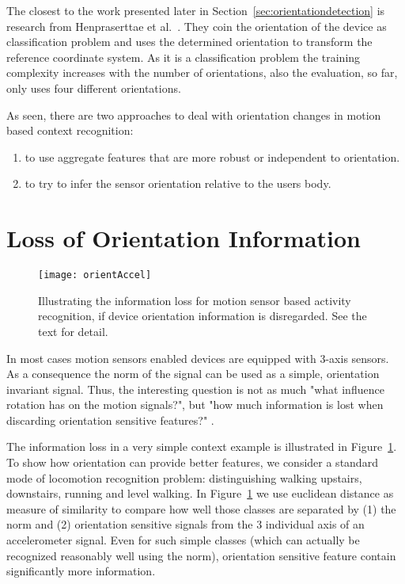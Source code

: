 The closest to the work presented later in Section~\ref{sec:orientationdetection} is research from Henpraserttae et al.~\cite{Henpraserttae:2011fa}. They coin the orientation of the device as classification problem and uses the determined orientation to transform the reference coordinate system. As it is a classification problem the training complexity increases with the number of orientations, also the evaluation, so far, only uses four different orientations.


As seen, there are two approaches to deal with orientation changes in motion based context recognition:
\begin{enumerate}
\item to use aggregate features that are more robust or independent to orientation.
\item to try to infer the sensor orientation relative to the users body.
\end{enumerate}


\section{Loss of Orientation Information}



\begin{figure}[t]
  \begin{center}
  \texttt{[image: orientAccel]}
	\end{center}
\caption[Loss of orientation information]{ Illustrating the information loss for motion sensor based activity recognition, if device orientation information is disregarded. See the text for
 detail.} \label{fig:orientation} \end{figure}

In most cases motion sensors enabled devices are equipped with 3-axis
sensors. As a consequence the norm of the signal can be used as a
simple, orientation invariant signal. Thus, the interesting question
is not as much "what influence rotation has on the motion signals?",
but "how much information is lost when discarding orientation
sensitive features?" . 

The information loss in a very simple context
example is illustrated in Figure~\ref{fig:orientation}.
To show how orientation can provide better features, we consider
a standard mode of locomotion recognition problem: distinguishing
walking upstairs, downstairs, running and level walking. 
In Figure~\ref{fig:orientation} we use euclidean distance as measure of similarity 
to compare how well those classes are separated by (1) the norm and (2) orientation sensitive signals from the 3
individual axis of an accelerometer signal. Even
for such simple classes (which can actually be recognized reasonably
well using the norm), orientation sensitive feature contain
significantly more information.

